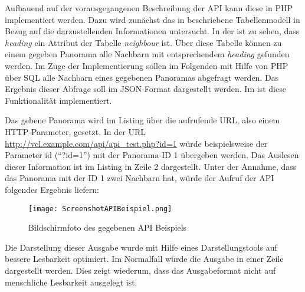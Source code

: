 
Aufbauend auf der vorausgegangenen Beschreibung der API kann diese in PHP
implementiert werden. Dazu wird zunächst das in 
beschriebene Tabellenmodell in Bezug auf die darzustellenden Informationen
untersucht. In der  ist zu sehen, dass
\textit{heading} ein Attribut der Tabelle \textit{neighbour} ist. Über diese
Tabelle können zu einem gegeben Panorama alle Nachbarn mit entsprechendem
\textit{heading} gefunden werden.
Im Zuge der Implementierung sollen im Folgenden mit Hilfe von PHP über SQL alle
Nachbarn eines gegebenen Panoramas abgefragt werden. Das Ergebnis dieser
Abfrage soll im JSON-Format dargestellt werden. Im 
ist diese Funktionalität implementiert.



Das gebene Panorama wird im Listing über die aufrufende URL, also einem
HTTP\footnotemark -Parameter, gesetzt. In der URL
\url{http://vcl.example.com/api/api\_test.php?id=1} würde beispielsweise der
Parameter id ("`?id=1"') mit der Panorama-ID 1 übergeben werden. Das
Auslesen dieser Information ist im Listing in Zeile 2 dargestellt.
Unter der Annahme, dass das Panorama mit der ID 1 zwei Nachbarn hat, würde der
Aufruf der API folgendes Ergebnis liefern:


\clearpage

\begin{figure}[htb]
\centering
\texttt{[image: ScreenshotAPIBeispiel.png]}
\caption[API Beispiel]{Bildschirmfoto des gegebenen API Beispiels}
\label{fig:ScreenshotAPIBeispiel}
\end{figure}

Die Darstellung dieser Ausgabe wurde mit Hilfe eines Darstellungstools auf
bessere Lesbarkeit optimiert. Im Normalfall würde die Ausgabe in einer Zeile
dargestellt werden. Dies zeigt wiederum, dass das Ausgabeformat nicht auf
menschliche Lesbarkeit ausgelegt ist.

